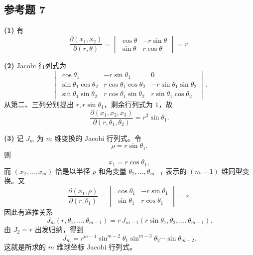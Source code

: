 \subsection*{参考题 7}
\begin{xsolution}
\textbf{(1)} 有
\[
  \frac{\partial(x_1,x_2)}{\partial(r,\theta)}
  =
  \begin{vmatrix}
    \cos\theta&-r\sin\theta\\
    \sin\theta&r\cos\theta
  \end{vmatrix}
  =\boxed{r}.
\]

\textbf{(2)} Jacobi 行列式为
\[
  \begin{vmatrix}
    \cos\theta_1&-r\sin\theta_1&0\\
    \sin\theta_1\cos\theta_2&r\cos\theta_1\cos\theta_2&-r\sin\theta_1\sin\theta_2\\
    \sin\theta_1\sin\theta_2&r\cos\theta_1\sin\theta_2&r\sin\theta_1\cos\theta_2
  \end{vmatrix}.
\]
从第二、三列分别提出 $r,r\sin\theta_1$，剩余行列式为 $1$，故
\[
  \boxed{
  \frac{\partial(x_1,x_2,x_3)}{\partial(r,\theta_1,\theta_2)}
  =r^2\sin\theta_1}.
\]

\textbf{(3)} 记 $J_m$ 为 $m$ 维变换的 Jacobi 行列式。令
\[
  \rho=r\sin\theta_1.
\]
则
\[
  x_1=r\cos\theta_1,
\]
而 $(x_2,\ldots,x_m)$ 恰是以半径 $\rho$ 和角变量 $\theta_2,\ldots,\theta_{m-1}$ 表示的 $(m-1)$ 维同型变换。又
\[
  \frac{\partial(x_1,\rho)}{\partial(r,\theta_1)}
  =
  \begin{vmatrix}
    \cos\theta_1&-r\sin\theta_1\\
    \sin\theta_1&r\cos\theta_1
  \end{vmatrix}
  =r.
\]
因此有递推关系
\[
  J_m(r,\theta_1,\ldots,\theta_{m-1})
  =r\,J_{m-1}(r\sin\theta_1,\theta_2,\ldots,\theta_{m-1}).
\]
由 $J_2=r$ 出发归纳，得到
\[
  \boxed{
  J_m
  =r^{m-1}
   \sin^{m-2}\theta_1
   \sin^{m-3}\theta_2\cdots
   \sin\theta_{m-2}}.
\]
这就是所求的 $m$ 维球坐标 Jacobi 行列式。
\end{xsolution}

